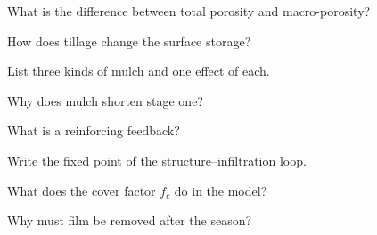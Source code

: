 \begin{exlist}
\item What is the difference between total porosity and macro-porosity?
\item How does tillage change the surface storage?
\item List three kinds of mulch and one effect of each.
\item Why does mulch shorten stage one?
\item What is a reinforcing feedback?
\item Write the fixed point of the structure--infiltration loop.
\item What does the cover factor $f_c$ do in the model?
\item Why must film be removed after the season?
\end{exlist}
